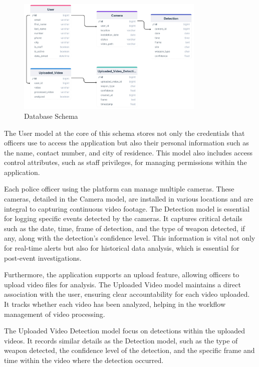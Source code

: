 \begin{figure}[h]
    \centering 
    \includegraphics[width=0.8\textwidth]{figs/database-schema2.png} 
    \caption{Database Schema}
    \label{fig:db-schema}
\end{figure}

The User model at the core of this schema stores not only the credentials that officers use to access the application 
but also their personal information such as the name, contact number, and city of residence. This model also includes 
access control attributes, such as staff privileges, for managing 
permissions within the application.

Each police officer using the platform can manage multiple cameras. These cameras, detailed in the Camera model, 
are installed in various locations and are integral to capturing continuous video footage. The Detection model is 
essential for logging specific events detected by the cameras. It captures critical details such as the date, time, 
frame of detection, and the type of weapon detected, if any, along with the detection's confidence level. This 
information is vital not only for real-time alerts but also for historical data analysis, which is essential for 
post-event investigations.

Furthermore, the application supports an upload feature, allowing officers to upload video files for analysis. 
The Uploaded Video model maintains a direct association with the user, ensuring clear accountability for each 
video uploaded. It tracks whether each video has been analyzed, helping in the workflow management of video processing.

The Uploaded Video Detection model focus on detections within the uploaded videos. 
It records similar details as the Detection model, such as the type of weapon detected, the confidence level of 
the detection, and the specific frame and time within the video where the detection occurred.
